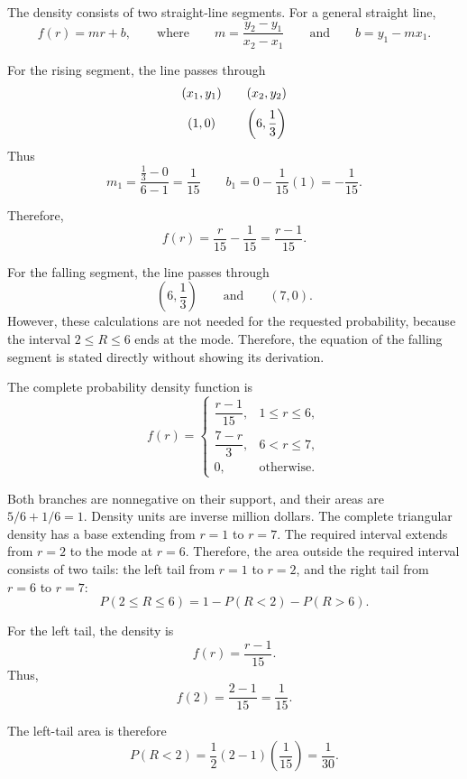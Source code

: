 {			
			The density consists of two straight-line segments. For a general
			straight line,
			\[
			f(r)=mr+b,
			\qquad
			\text{where}
			\qquad
			m=\frac{y_2-y_1}{x_2-x_1}
			\qquad\text{and}\qquad
			b=y_1-mx_1.
			\]
			
			For the rising segment, the line passes through
			\[
			\begin{array}{c@{\qquad}c}
				(x_1,y_1) & (x_2,y_2) \\[2mm]
				(1,0)
				&
				\left(6,\dfrac13\right)
			\end{array}
			\]
			Thus
			\[
			m_1
			=
			\frac{\frac13-0}{6-1}
			=
			\frac1{15}
			\qquad
			b_1
			=
			0-\frac1{15}(1)
			=
			-\frac1{15}.
			\]
			
			Therefore,
			\[
			f(r)
			=
			\frac{r}{15}-\frac1{15}
			=
			\frac{r-1}{15}.
			\]
			
			For the falling segment, the line passes through
			\[
			\left(6,\frac13\right)
			\qquad\text{and}\qquad
			(7,0).
			\]
			However, these calculations are not needed for the requested
			probability, because the interval \(2\le R\le6\) ends at the mode.
			Therefore, the equation of the falling segment is stated directly
			without showing its derivation.
			
			The complete probability density function is
			\[
			f(r)=
			\begin{cases}
				\dfrac{r-1}{15},&1\le r\le6,\\[1mm]
				\dfrac{7-r}{3},&6<r\le7,\\[1mm]
				0,&\text{otherwise.}
			\end{cases}
			\]
		
		Both branches are nonnegative on their support, and their areas are
        \(5/6+1/6=1\). Density units are inverse million dollars.
		The complete triangular density has a base extending from
		\(r=1\) to \(r=7\). The required interval extends from
		\(r=2\) to the mode at \(r=6\). Therefore, the area outside
		the required interval consists of two tails:
		the left tail from \(r=1\) to \(r=2\), and the right tail
		from \(r=6\) to \(r=7\):
		\[
		P(2\le R\le6)
		=
		1-P(R<2)-P(R>6).
		\]
		
		For the left tail, the density is
		\[
		f(r)=\frac{r-1}{15}.
		\]
		Thus,
		\[
		f(2)
		=
		\frac{2-1}{15}
		=
		\frac1{15}.
		\]
		
		The left-tail area is therefore
		\[
		P(R<2)
		=
		\frac12(2-1)\left(\frac1{15}\right)
		=
		\frac1{30}.
		\]
		
}
